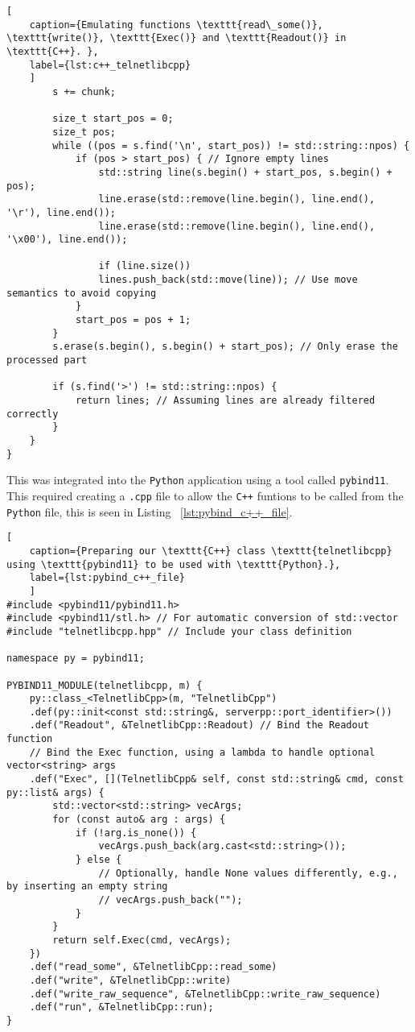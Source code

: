 \begin{lstlisting}[
	caption={Emulating functions \texttt{read\_some()}, \texttt{write()}, \texttt{Exec()} and \texttt{Readout()} in \texttt{C++}. },
	label={lst:c++_telnetlibcpp}
	]
		s += chunk;
		
		size_t start_pos = 0;
		size_t pos;
		while ((pos = s.find('\n', start_pos)) != std::string::npos) {
			if (pos > start_pos) { // Ignore empty lines
				std::string line(s.begin() + start_pos, s.begin() + pos);
				line.erase(std::remove(line.begin(), line.end(), '\r'), line.end());
				line.erase(std::remove(line.begin(), line.end(), '\x00'), line.end());
				
				if (line.size())
				lines.push_back(std::move(line)); // Use move semantics to avoid copying
			}
			start_pos = pos + 1;
		}
		s.erase(s.begin(), s.begin() + start_pos); // Only erase the processed part
		
		if (s.find('>') != std::string::npos) {
			return lines; // Assuming lines are already filtered correctly
		}
	}
}

\end{lstlisting}

This was integrated into the \texttt{Python} application using a tool called \texttt{pybind11}. This required creating a \texttt{.cpp} file to allow the \texttt{C++} funtions to be called from the \texttt{Python} file, this is seen in Listing ~\ref{lst:pybind_c++_file}.

\begin{lstlisting}[
	caption={Preparing our \texttt{C++} class \texttt{telnetlibcpp} using \texttt{pybind11} to be used with \texttt{Python}.},
	label={lst:pybind_c++_file}
	]
#include <pybind11/pybind11.h>
#include <pybind11/stl.h> // For automatic conversion of std::vector
#include "telnetlibcpp.hpp" // Include your class definition

namespace py = pybind11;

PYBIND11_MODULE(telnetlibcpp, m) {
	py::class_<TelnetlibCpp>(m, "TelnetlibCpp")
	.def(py::init<const std::string&, serverpp::port_identifier>())
	.def("Readout", &TelnetlibCpp::Readout) // Bind the Readout function
	// Bind the Exec function, using a lambda to handle optional vector<string> args
	.def("Exec", [](TelnetlibCpp& self, const std::string& cmd, const py::list& args) {
		std::vector<std::string> vecArgs;
		for (const auto& arg : args) {
			if (!arg.is_none()) {
				vecArgs.push_back(arg.cast<std::string>());
			} else {
				// Optionally, handle None values differently, e.g., by inserting an empty string
				// vecArgs.push_back("");
			}
		}
		return self.Exec(cmd, vecArgs);
	})
	.def("read_some", &TelnetlibCpp::read_some)
	.def("write", &TelnetlibCpp::write)
	.def("write_raw_sequence", &TelnetlibCpp::write_raw_sequence)
	.def("run", &TelnetlibCpp::run);
}
\end{lstlisting}

